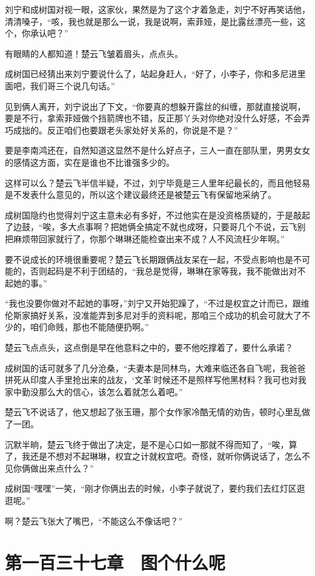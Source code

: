 刘宁和成树国对视一眼，这家伙，果然是为了这个才着急走，刘宁不好再笑话他，清清嗓子，“咳，我也就是那么一说，我是说啊，索菲娅，是比露丝漂亮一些，这个，你承认吧？”

有眼睛的人都知道！楚云飞皱着眉头，点点头。

成树国已经猜出来刘宁要说什么了，站起身赶人，“好了，小李子，你和多尼进里面吧，我们哥三个说几句话。”

见到俩人离开，刘宁说出了下文，“你要真的想躲开露丝的纠缠，那就直接说啊，要是不行，拿索菲娅做个挡箭牌也不错，反正那丫头对你绝对没什么好感，不会弄巧成拙的。反正咱们也要跟老头家处好关系的，你说是不是？”

要是李南鸿还在，自然知道这显然不是什么好点子，三人一直在部队里，男男女女的感情这方面，实在是谁也不比谁强多少的。

这样可以么？楚云飞半信半疑，不过，刘宁毕竟是三人里年纪最长的，而且他轻易是不发表什么意见的，所以这个建议最终还是被楚云飞有保留地采纳了。

成树国隐约也觉得刘宁这主意未必有多好，不过他实在是没资格质疑的，于是敲起了边鼓，“唉，多大点事啊？把她俩全搞定不就也成呀，只要哥几个不说，云飞别把麻烦带回家就行了，你那个琳琳还能检查出来不成？人不风流枉少年啊。”

要不说成长的环境很重要呢？楚云飞长期跟俩战友呆在一起，不受点影响也是不可能的，否则起码是不利于团结的，“我总是觉得，琳琳在家等我，我不能做出对不起她的事。”

“我也没要你做对不起她的事呀，”刘宁又开始犯躁了，“不过是权宜之计而已，跟维伦斯家搞好关系，没准能弄到多尼对手的资料呢，那咱三个成功的机会可就大了不少的，咱们命贱，那也不能随便扔啊。”

楚云飞点点头，这点倒是早在他意料之中的，要不他吃撑着了，要什么承诺？

成树国的话可就多了几分沧桑，“夫妻本是同林鸟，大难来临还各自飞呢，我爸爸拼死从印度人手里抢出来的战友，‘文革’时候还不是照样写他黑材料？我可也对我家中勤没那么大的信心，该怎么着就怎么着吧。”

楚云飞不说话了，他又想起了张玉珊，那个女作家冷酷无情的劝告，顿时心里乱做了一团。

沉默半晌，楚云飞终于做出了决定，是不是心口如一那就不得而知了，“唉，算了，我还是不想对不起琳琳，权宜之计就权宜吧。奇怪，就听你俩说话了，怎么不见你俩做出来点什么？”

成树国“嘿嘿”一笑，“刚才你俩出去的时候，小李子就说了，要约我们去红灯区逛逛呢。”

啊？楚云飞张大了嘴巴，“不能这么不像话吧？”

\section{第一百三十七章　图个什么呢}

